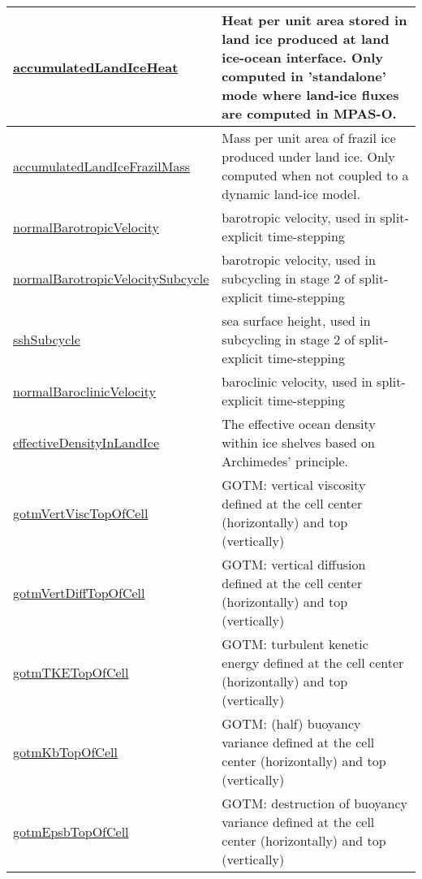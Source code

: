 {\begin{center}
\begin{longtable}{| p{2.0in} | p{4.0in} |}
    \hline
    \hyperref[subsec:var_sec_state_accumulatedLandIceHeat]{accumulatedLandIceHeat} & Heat per unit area stored in land ice produced at land ice-ocean interface. Only computed in 'standalone' mode where land-ice fluxes are computed in MPAS-O. \\
    \hline
    \hyperref[subsec:var_sec_state_accumulatedLandIceFrazilMass]{accumulatedLandIceFrazilMass} & Mass per unit area of frazil ice produced under land ice.  Only computed when not coupled to a dynamic land-ice model. \\
    \hline
    \hyperref[subsec:var_sec_state_normalBarotropicVelocity]{normalBarotropicVelocity} & barotropic velocity, used in split-explicit time-stepping \\
    \hline
    \hyperref[subsec:var_sec_state_normalBarotropicVelocitySubcycle]{normalBarotropicVelocity\-Subcycle} & barotropic velocity, used in subcycling in stage 2 of split-explicit time-stepping \\
    \hline
    \hyperref[subsec:var_sec_state_sshSubcycle]{sshSubcycle} & sea surface height, used in subcycling in stage 2 of split-explicit time-stepping \\
    \hline
    \hyperref[subsec:var_sec_state_normalBaroclinicVelocity]{normalBaroclinicVelocity} & baroclinic velocity, used in split-explicit time-stepping \\
    \hline
    \hyperref[subsec:var_sec_state_effectiveDensityInLandIce]{effectiveDensityInLandIce} & The effective ocean density within ice shelves based on Archimedes' principle. \\
    \hline
    \hyperref[subsec:var_sec_state_gotmVertViscTopOfCell]{gotmVertViscTopOfCell} & GOTM: vertical viscosity defined at the cell center (horizontally) and top (vertically) \\
    \hline
    \hyperref[subsec:var_sec_state_gotmVertDiffTopOfCell]{gotmVertDiffTopOfCell} & GOTM: vertical diffusion defined at the cell center (horizontally) and top (vertically) \\
    \hline
    \hyperref[subsec:var_sec_state_gotmTKETopOfCell]{gotmTKETopOfCell} & GOTM: turbulent kenetic energy defined at the cell center (horizontally) and top (vertically) \\
    \hline
    \hyperref[subsec:var_sec_state_gotmKbTopOfCell]{gotmKbTopOfCell} & GOTM: (half) buoyancy variance defined at the cell center (horizontally) and top (vertically) \\
    \hline
    \hyperref[subsec:var_sec_state_gotmEpsbTopOfCell]{gotmEpsbTopOfCell} & GOTM: destruction of buoyancy variance defined at the cell center (horizontally) and top (vertically) \\

\end{longtable}
\end{center}}
